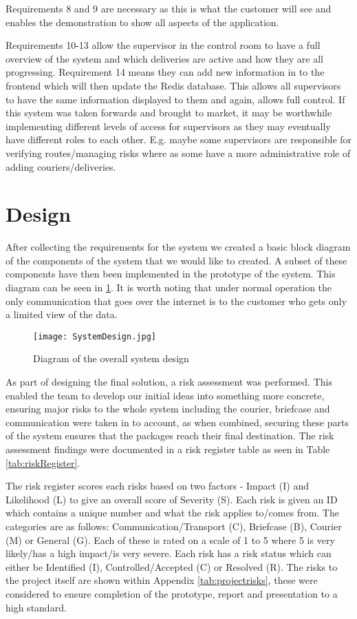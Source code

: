 Requirements 8 and 9 are necessary as this is what the customer will see and enables the demonstration to show all aspects of the application.

Requirements 10-13 allow the supervisor in the control room to have a full overview of the system and which deliveries are active and how they are all progressing. Requirement 14 means they can add new information in to the frontend which will then update the Redis database. This allows all supervisors to have the same information displayed to them and again, allows full control. If this system was taken forwards and brought to market, it may be worthwhile implementing different levels of access for supervisors as they may eventually have different roles to each other. E.g. maybe some supervisors are responsible for verifying routes/managing risks where as some have a more administrative role of adding couriers/deliveries.




\section{Design}

After collecting the requirements for the system we created a basic block diagram of the components of the system that we would like to created. A subset of these components have then been implemented in the prototype of the system. This diagram can be seen in \ref{fig:SystemDesign}. It is worth noting that under normal operation the only communication that goes over the internet is to the customer who gets only a limited view of the data. 

\begin{figure}[h]
\texttt{[image: SystemDesign.jpg]}
    \centering
    \caption{Diagram of the overall system design}
    \label{fig:SystemDesign}
\end{figure}

As part of designing the final solution, a risk assessment was performed. This enabled the team to develop our initial ideas into something more concrete, ensuring major risks to the whole system including the courier, briefcase and communication were taken in to account, as when combined, securing these parts of the system ensures that the packages reach their final destination. The risk assessment findings were documented in a risk register table as seen in Table \ref{tab:riskRegister}.

The risk register scores each risks based on two factors - Impact (I) and Likelihood (L) to give an overall score of Severity (S). Each risk is given an ID which contains a unique number and what the risk applies to/comes from. The categories are as follows: Communication/Transport (C), Briefcase (B), Courier  (M) or General (G). Each of these is rated on a scale of 1 to 5 where 5 is very likely/has a high impact/is very severe. Each risk has a risk status which can either be Identified (I), Controlled/Accepted (C) or Resolved (R). The risks to the project itself are shown within Appendix \ref{tab:projectrisks}, these were considered to ensure completion of the prototype, report and presentation to a high standard.


